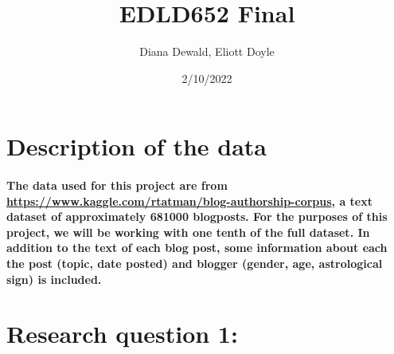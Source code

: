 \documentclass[
]{article}
\title{EDLD652 Final}
\author{Diana Dewald, Eliott Doyle}
\date{2/10/2022}
\begin{document}
\maketitle

\hypertarget{description-of-the-data}{%
\section{Description of the data}\label{description-of-the-data}}

\hypertarget{the-data-used-for-this-project-are-from-httpswww.kaggle.comrtatmanblog-authorship-corpus-a-text-dataset-of-approximately-681000-blogposts.-for-the-purposes-of-this-project-we-will-be-working-with-one-tenth-of-the-full-dataset.-in-addition-to-the-text-of-each-blog-post-some-information-about-each-the-post-topic-date-posted-and-blogger-gender-age-astrological-sign-is-included.}{%
\paragraph{\texorpdfstring{The data used for this project are from
\url{https://www.kaggle.com/rtatman/blog-authorship-corpus}, a text
dataset of approximately 681000 blogposts. For the purposes of this
project, we will be working with one tenth of the full dataset. In
addition to the text of each blog post, some information about each the
post (topic, date posted) and blogger (gender, age, astrological sign)
is
included.}{The data used for this project are from https://www.kaggle.com/rtatman/blog-authorship-corpus, a text dataset of approximately 681000 blogposts. For the purposes of this project, we will be working with one tenth of the full dataset. In addition to the text of each blog post, some information about each the post (topic, date posted) and blogger (gender, age, astrological sign) is included.}}\label{the-data-used-for-this-project-are-from-httpswww.kaggle.comrtatmanblog-authorship-corpus-a-text-dataset-of-approximately-681000-blogposts.-for-the-purposes-of-this-project-we-will-be-working-with-one-tenth-of-the-full-dataset.-in-addition-to-the-text-of-each-blog-post-some-information-about-each-the-post-topic-date-posted-and-blogger-gender-age-astrological-sign-is-included.}}

\hypertarget{research-question-1}{%
\section{Research question 1:}\label{research-question-1}}
\end{document}
